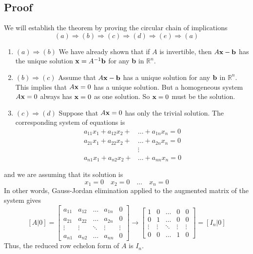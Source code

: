 \subsection*{Proof}
We will establish the theorem by proving the circular chain of implications
\[(a)\Rightarrow(b)\Rightarrow(c)\Rightarrow(d)\Rightarrow(e)\Rightarrow(a)\]
\begin{enumerate}
    \item[] $(a)\Rightarrow(b)$ We have already shown that if $A$ is invertible, then $A\mathbf{x}-\mathbf{b}$ has the unique solution $\mathbf{x}=A^{-1}\mathbf{b}$ for any \textbf{b} in $\mathbb{R}^n$.
    \item[] $(b)\Rightarrow(c)$ Assume that $A\mathbf{x}-\mathbf{b}$ has a unique solution for any $\mathbf{b}$ in $\mathbb{R}^n$. This implies that $A\mathbf{x}=0$ has a unique solution. But a homogeneous system $A\mathbf{x}=0$ always has $\mathbf{x}=0$ as one solution. So $\mathbf{x}=0$ must be the solution.
    \item[] $(c)\Rightarrow(d)$ Suppose that $A\mathbf{x}=0$ has only the trivial solution. The corresponding system of equations is
          \begin{align*}
              a_{11}x_1+a_{12}x_2+ & \dots+a_{1n}x_n=0 \\
              a_{21}x_1+a_{22}x_2+ & \dots+a_{2n}x_n=0 \\
                                   & \vdots            \\
              a_{n1}x_1+a_{n2}x_2+ & \dots+a_{nn}x_n=0
          \end{align*}
\end{enumerate}
and we are assuming that its solution is
\[x_1=0 \quad x_2=0 \quad \dots \quad x_n=0\]
In other words, Gauss-Jordan elimination applied to the augmented matrix of the system gives
\[
    [A|0]=
    \left[\begin{array}{cccc|c}
            a_{11} & a_{12} & \dots  & a_{1n} & 0      \\
            a_{21} & a_{22} & \dots  & a_{2n} & 0      \\
            \vdots & \vdots & \ddots & \vdots & \vdots \\
            a_{n1} & a_{n2} & \dots  & a_{nn} & 0
        \end{array}\right]\to
    \left[\begin{array}{cccc|c}
            1      & 0      & \dots  & 0      & 0      \\
            0      & 1      & \dots  & 0      & 0      \\
            \vdots & \vdots & \ddots & \vdots & \vdots \\
            0      & 0      & \dots  & 1      & 0
        \end{array}\right]=[I_n|0]
\]
Thus, the reduced row echelon form of $A$ is $I_n$.

